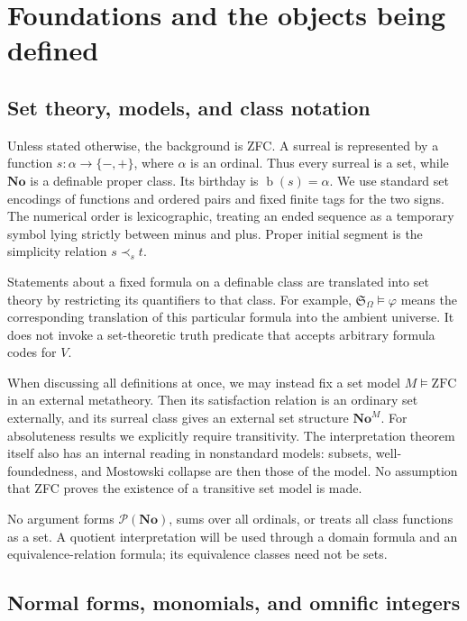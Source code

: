 \documentclass[11pt,a4paper]{article}
\numberwithin{equation}{section}
\theoremstyle{definition}
\theoremstyle{remark}
\newcommand{\No}{\mathbf{No}}
\newcommand{\bd}{\operatorname{b}}
\newcommand{\ps}{\mathrel{\prec_s}}
\newcommand{\Somega}{\mathfrak S_\Omega}
\begin{document}
\section{Foundations and the objects being defined}
\label{dsn:op:sec:foundations}

\subsection{Set theory, models, and class notation}

Unless stated otherwise, the background is ZFC.  A surreal is represented
by a function \(s:\alpha\to\{-,+\}\), where \(\alpha\) is an ordinal.
Thus every surreal is a set, while \(\No\) is a definable proper class.
Its birthday is \(\bd(s)=\alpha\).  We use standard set encodings of
functions and ordered pairs and fixed finite tags for the two signs.
The numerical order is lexicographic, treating an ended sequence as a
temporary symbol lying strictly between minus and plus.  Proper initial
segment is the simplicity relation \(s\ps t\).

Statements about a fixed formula on a definable class are translated into
set theory by restricting its quantifiers to that class.  For example,
\(\Somega\models\varphi\) means the corresponding translation of this
particular formula into the ambient universe.  It does not invoke a
set-theoretic truth predicate that accepts arbitrary formula codes for
\(V\).

When discussing all definitions at once, we may instead fix a set model
\(M\models\mathrm{ZFC}\) in an external metatheory.  Then its satisfaction
relation is an ordinary set externally, and its surreal class gives an
external set structure \(\No^M\).  For absoluteness results we explicitly
require transitivity.  The interpretation theorem itself also has an
internal reading in nonstandard models: subsets, well-foundedness, and
Mostowski collapse are then those of the model.  No assumption that ZFC
proves the existence of a transitive set model is made.

No argument forms \(\mathcal P(\No)\), sums over all ordinals, or treats
all class functions as a set.  A quotient interpretation will be used
through a domain formula and an equivalence-relation formula; its
equivalence classes need not be sets.

\subsection{Normal forms, monomials, and omnific integers}
\end{document}
